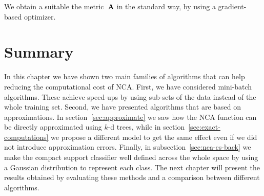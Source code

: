 	We obtain a suitable the metric~$\mathbf{A}$ in the standard way, by using a gradient-based optimizer.
	
	\section*{Summary}
	\label{sec:summary}
	
	In this chapter we have shown two main families of algorithms that can help reducing the computational cost of NCA\@. First, we have considered mini-batch algorithms. These achieve speed-ups by using sub-sets of the data instead of the whole training set. Second, we have presented algorithms that are based on approximations. In section~\ref{sec:approximate} we saw how the NCA function can be directly approximated using $k$-d trees, while in section~\ref{sec:exact-computations} we propose a different model to get the same effect even if we did not introduce approximation errors. Finally, in subsection~\ref{sec:nca-cs-back} we make the compact support classifier well defined across the whole space by using a Gaussian distribution to represent each class. The next chapter will present the results obtained by evaluating these methods and a comparison between different algorithms.